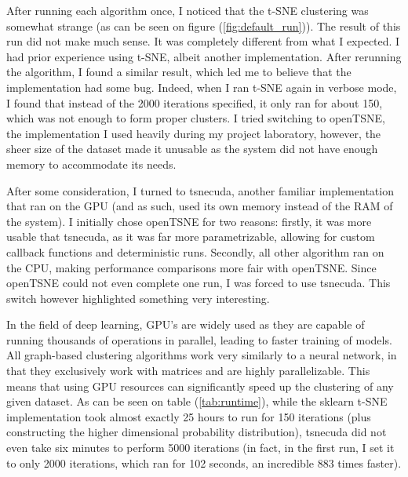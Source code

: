 After running each algorithm once, I noticed that the t-SNE clustering was somewhat strange (as can be seen on figure (\ref{fig:default_run})). The result of this run did not make much sense. It was completely different from what I expected. I had prior experience using t-SNE, albeit another implementation. After rerunning the algorithm, I found a similar result, which led me to believe that the implementation had some bug. Indeed, when I ran t-SNE again in verbose mode, I found that instead of the 2000 iterations specified, it only ran for about 150, which was not enough to form proper clusters. I tried switching to openTSNE, the implementation I used heavily during my project laboratory, however, the sheer size of the dataset made it unusable as the system did not have enough memory to accommodate its needs.

After some consideration, I turned to tsnecuda, another familiar implementation that ran on the GPU (and as such, used its own memory instead of the RAM of the system). I initially chose openTSNE for two reasons: firstly, it was more usable that tsnecuda, as it was far more parametrizable, allowing for custom callback functions and deterministic runs. Secondly, all other algorithm ran on the CPU, making performance comparisons more fair with openTSNE. Since openTSNE could not even complete one run, I was forced to use tsnecuda. This switch however highlighted something very interesting.

In the field of deep learning, GPU's are widely used as they are capable of running thousands of operations in parallel, leading to faster training of models. All graph-based clustering algorithms work very similarly to a neural network, in that they exclusively work with matrices and are highly parallelizable. This means that using GPU resources can significantly speed up the clustering of any given dataset. As can be seen on table (\ref{tab:runtime}), while the sklearn t-SNE implementation took almost exactly 25 hours to run for 150 iterations (plus constructing the higher dimensional probability distribution), tsnecuda did not even take six minutes to perform 5000 iterations (in fact, in the first run, I set it to only 2000 iterations, which ran for 102 seconds, an incredible 883 times faster).

